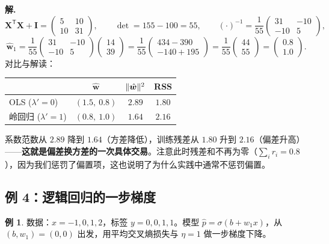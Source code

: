 \documentclass[UTF8,a4paper,11pt]{ctexart}
\theoremstyle{definition}
\newtheorem{example}[definition]{例}
\theoremstyle{plain}
\theoremstyle{remark}
\DeclarePairedDelimiter{\norm}{\lVert}{\rVert}
\newcommand{\T}{^{\mathsf{T}}}
\begin{document}
\noindent\textbf{解.}
\[
  \bm{X}\T\bm{X}+\bm{I}=\begin{pmatrix}5&10\\10&31\end{pmatrix},\qquad
  \det=155-100=55,\qquad
  (\cdot)^{-1}=\frac{1}{55}\begin{pmatrix}31&-10\\-10&5\end{pmatrix},
\]
\[
  \hat{\bm{w}}_{1}=\frac{1}{55}\begin{pmatrix}31&-10\\-10&5\end{pmatrix}\begin{pmatrix}14\\39\end{pmatrix}
  =\frac{1}{55}\begin{pmatrix}434-390\\-140+195\end{pmatrix}
  =\frac{1}{55}\begin{pmatrix}44\\55\end{pmatrix}
  =\begin{pmatrix}0.8\\1.0\end{pmatrix}.
\]
对比与解读：
\begin{center}
\begin{tabular}{@{}lccc@{}}
\toprule
 & $\hat{\bm{w}}$ & $\norm{\hat{\bm{w}}}^2$ & RSS\\
\midrule
OLS ($\lambda'=0$) & $(1.5,\ 0.8)$ & $2.89$ & $1.80$\\
岭回归 ($\lambda'=1$) & $(0.8,\ 1.0)$ & $1.64$ & $2.16$\\
\bottomrule
\end{tabular}
\end{center}
系数范数从 $2.89$ 降到 $1.64$（方差降低），训练残差从 $1.80$ 升到 $2.16$（偏差升高）——\textbf{这就是偏差换方差的一次具体交易}。注意此时残差和不再为零（$\sum_ir_i=0.8$），因为我们惩罚了偏置项，这也说明了为什么实践中通常不惩罚偏置。

\subsection{例 4：逻辑回归的一步梯度}

\begin{example}\label{ex:logreg}
数据：$x=-1,0,1,2$，标签 $y=0,0,1,1$。模型 $\hat p=\sigma(b+w_1x)$，从 $(b,w_1)=(0,0)$ 出发，用平均交叉熵损失与 $\eta=1$ 做一步梯度下降。
\end{example}
\end{document}
